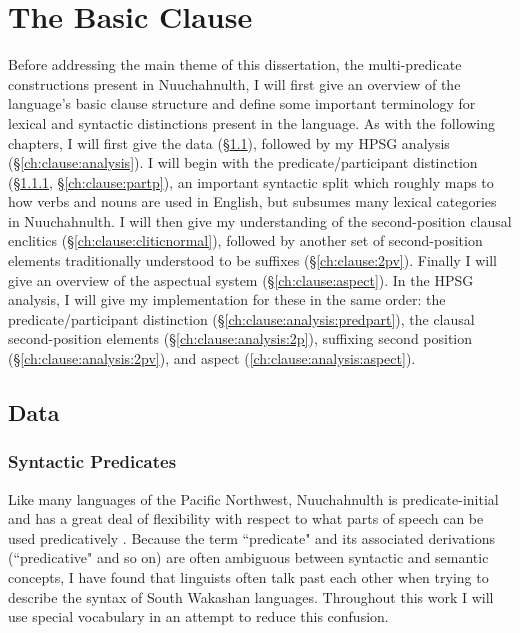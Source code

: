 \chapter{The Basic Clause} \label{ch:clause}

Before addressing the main theme of this dissertation, the multi-predicate constructions present in Nuuchahnulth, I will first give an overview of the language's basic clause structure and define some important terminology for lexical and syntactic distinctions present in the language. As with the following chapters, I will first give the data (\S\ref{ch:clause:data}), followed by my HPSG analysis (\S\ref{ch:clause:analysis}). I will begin with the predicate/participant distinction (\S\ref{ch:clause:predp}, \S\ref{ch:clause:partp}), an important syntactic split which roughly maps to how verbs and nouns are used in English, but subsumes many lexical categories in Nuuchahnulth. I will then give my understanding of the second-position clausal enclitics (\S\ref{ch:clause:cliticnormal}), followed by another set of second-position elements traditionally understood to be suffixes (\S\ref{ch:clause:2pv}). Finally I will give an overview of the aspectual system (\S\ref{ch:clause:aspect}). In the HPSG analysis, I will give my implementation for these in the same order: the predicate/participant distinction (\S\ref{ch:clause:analysis:predpart}), the clausal second-position elements (\S\ref{ch:clause:analysis:2p}), suffixing second position (\S\ref{ch:clause:analysis:2pv}), and aspect (\ref{ch:clause:analysis:aspect}).

\section{Data} \label{ch:clause:data}

\subsection{Syntactic Predicates} \label{ch:clause:predp}

Like many languages of the Pacific Northwest, Nuuchahnulth is predicate-initial and has a great deal of flexibility with respect to what parts of speech can be used predicatively \citep{sapir1911, swadesh1938, jacobsen1979}. Because the term ``predicate" and its associated derivations (``predicative" and so on) are often ambiguous between syntactic and semantic concepts, I have found that linguists often talk past each other when trying to describe the syntax of South Wakashan languages. Throughout this work I will use special vocabulary in an attempt to reduce this confusion.

